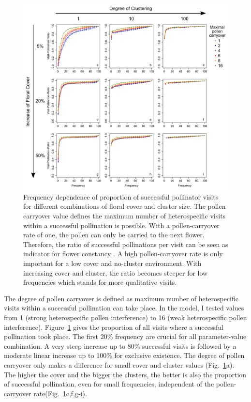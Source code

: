 \begin{figure} [!ht] %
	\centering
	\includegraphics[width=15cm]{Images/POC}
	\caption{Frequency dependence of proportion of successful pollinator visits for different combinations of floral cover and cluster size. The pollen carryover value defines the maximum number of heterospecific visits within a successful pollination is possible. With a pollen-carryover rate of one, the pollen can only be carried to the next flower. Therefore, the ratio of successful pollinations per visit can be seen as indicator for flower constancy \citep{montgomery2009pollen}. A high pollen-carryover rate is only important for a low cover and no-cluster environment. With increasing cover and cluster, the ratio becomes steeper for low frequencies which stands for more qualitative visits.}
	\label{fig:POC}
\end{figure}

The degree of pollen carryover is defined as maximum number of heterospecific visits within a successful pollination can take place. In the model, I tested values from 1 (strong heterospecific pollen interference) to 16 (weak heterospecific pollen interference). Figure~\ref{fig:POC} gives the proportion of all visits where a successful pollination took place. The first 20\% frequency are crucial for all parameter-value combination. A very steep increase up to 80\% successful visits is followed by a moderate linear increase up to 100\% for exclusive existence. The degree of pollen carryover only makes a difference for small cover and cluster values (Fig.~\ref{fig:POC}a). The higher the cover and the bigger the clusters, the better is also the proportion of successful pollination, even for small frequencies, independent of the pollen-carryover rate(Fig.~\ref{fig:POC}c,f,g-i). 

